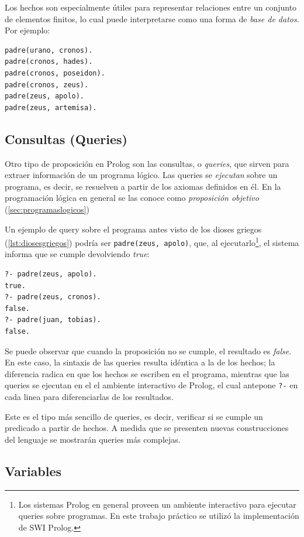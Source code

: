 \documentclass[12pt,titlepage]{article}
\begin{document}
Los hechos son especialmente útiles para representar relaciones entre un conjunto de elementos finitos, lo cual puede interpretarse como una forma de \emph{base de datos}. Por ejemplo:
\begin{lstlisting}[label=lst:diosesgriegos]
padre(urano, cronos).
padre(cronos, hades).
padre(cronos, poseidon).
padre(cronos, zeus).
padre(zeus, apolo).
padre(zeus, artemisa).
\end{lstlisting}

\subsection{Consultas (Queries)}

Otro tipo de proposición en Prolog son las consultas, o \emph{queries}, que sirven para extraer información de un programa lógico. Las queries se \emph{ejecutan} sobre un programa, es decir, se resuelven a partir de los axiomas definidos en él. En la programación lógica en general se las conoce como \emph{proposición objetivo} (\ref{sec:programaslogicos})

Un ejemplo de query sobre el programa antes visto de los dioses griegos (\ref{lst:diosesgriegos}) podría ser \lstinline|padre(zeus, apolo)|, que, al ejecutarlo\footnote{Los sistemas Prolog en general proveen un ambiente interactivo para ejecutar queries sobre programas. En este trabajo práctico se utilizó la implementación de SWI Prolog.}, el sistema informa que se cumple devolviendo \emph{true}:
\begin{lstlisting}
?- padre(zeus, apolo).
true.
?- padre(zeus, cronos).
false.
?- padre(juan, tobias).
false.
\end{lstlisting}

Se puede observar que cuando la proposición no se cumple, el resultado es \emph{false}. En este caso, la sintaxis de las queries resulta idéntica a la de los hechos; la diferencia radica en que los hechos se escriben en el programa, mientras que las queries se ejecutan en el el ambiente interactivo de Prolog, el cual antepone \lstinline|?-| en cada linea para diferenciarlas de los resultados.

Este es el tipo más sencillo de queries, es decir, verificar si se cumple un predicado a partir de hechos. A medida que se presenten nuevas construcciones del lenguaje se mostrarán queries más complejas.

\subsection{Variables}
\end{document}
